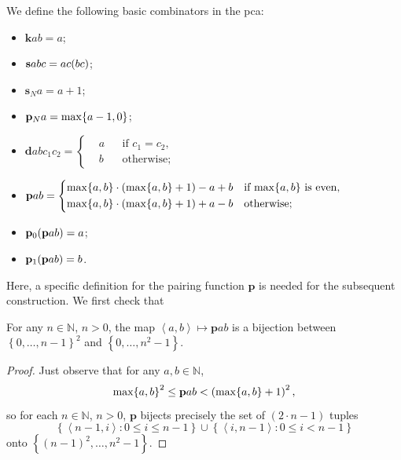 \documentclass[preprint]{elsarticle}
\theoremstyle{plain}
\newcommand{\tuple}[1]{\left\langle #1 \right\rangle}
\begin{document}
We define the following basic combinators in the pca:
\begin{itemize}
  \item $\mathbf{k}ab = a$;
  \item $\mathbf{s}abc = ac\mleft(bc\mright)$;
  \item $\mathbf{s}_N a = a + 1$;
  \item $\mathbf{p}_N a = \mathrm{max}\mleft\{a - 1, 0\mright\}$;
  \item $\mathbf{d}abc_1c_2 = \left\{\begin{aligned}
             & a &  & \text{if $c_1 = c_2$}, \\
             & b &  & \text{otherwise};
          \end{aligned}\right.$
  \item $\mathbf{p}ab = \left\{\begin{aligned}
             & \mathrm{max}\mleft\{a, b\mright\} \cdot \left(\mathrm{max}\mleft\{a, b\mright\} + 1\right) - a + b &  & \text{if $\mathrm{max}\mleft\{a, b\mright\}$ is even}, \\
             & \mathrm{max}\mleft\{a, b\mright\} \cdot \left(\mathrm{max}\mleft\{a, b\mright\} + 1\right) + a - b &  & \text{otherwise};
          \end{aligned}\right.$
  \item $\mathbf{p}_0\mleft(\mathbf{p}ab\mright) = a$;
  \item $\mathbf{p}_1\mleft(\mathbf{p}ab\mright) = b$.
\end{itemize}
Here, a specific definition for the pairing function $\mathbf{p}$ is needed for the subsequent construction. We first check that
\begin{lemma}[$\mathrm{PA}$]
  For any $n \in \mathbb{N}$, $n > 0$, the map $\tuple{a, b} \mapsto \mathbf{p}ab$ is a bijection between $\left\{0, \ldots, n - 1\right\}^2$ and $\left\{0, \ldots, n^2 - 1\right\}$.
\end{lemma}

\begin{proof}
  Just observe that for any $a, b \in \mathbb{N}$,
  \[\mathrm{max}\mleft\{a, b\mright\}^2 \leq \mathbf{p}ab < \left(\mathrm{max}\mleft\{a, b\mright\} + 1\right)^2,\]
  so for each $n \in \mathbb{N}$, $n > 0$, $\mathbf{p}$ bijects precisely the set of $\left(2 \cdot n - 1\right)$ tuples
  \[\left\{\tuple{n - 1, i} : 0 \leq i \leq n - 1\right\} \cup \left\{\tuple{i, n - 1} : 0 \leq i < n - 1\right\}\]
  onto $\left\{\left(n - 1\right)^2, \ldots, n^2 - 1\right\}$.
\end{proof}
\end{document}
